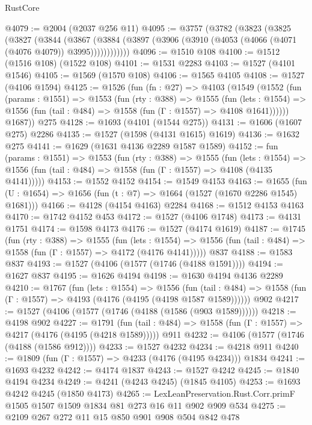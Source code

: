 \begin{lexlean}{RustCore}
\begin{coremodule}
@4079 := @2004 (@2037 @256 @11)
@4095 := @3757
    (@3782
      (@3823
        (@3825
          (@3827
            (@3844
              (@3867
                (@3884 (@3897 (@3906 (@3910 (@4053 (@4066 (@4071 (@4076 @4079)) @3995))))))))))))
@4096 := @1510 @108
@4100 := @1512 (@1516 @108) (@1522 @108)
@4101 := @1531 @2283
@4103 := @1527 (@4101 @1546)
@4105 := @1569 (@1570 @108)
@4106 := @1565 @4105
@4108 := @1527 (@4106 @1594)
@4125 := @1526
    (fun (fn : @27) =>
    @4103
      (@1549
        (@1552
          (fun (params : @1551) =>
          @1553
            (fun (rty : @388) =>
            @1555
              (fun (lets : @1554) =>
              @1556 (fun (tail : @484) => @1558 (fun (Γ : @1557) => @4108 @1641))))))
        @1687))
    @275
@4128 := @1693 (@4101 (@1544 @275))
@4131 := @1606 (@1607 @275) @2286
@4135 := @1527 (@1598 (@4131 @1615) @1619)
@4136 := @1632 @275
@4141 := @1629 (@1631 @4136 @2289 @1587 @1589)
@4152 := fun (params : @1551) =>
  @1553
    (fun (rty : @388) =>
    @1555
      (fun (lets : @1554) =>
      @1556 (fun (tail : @484) => @1558 (fun (Γ : @1557) => @4108 (@4135 @4141)))))
@4153 := @1552 @4152
@4154 := @1549 @4153
@4163 := @1655 (fun (U : @1654) => @1656 (fun (t : @7) => @1664 (@1527 (@1670 @2286 @1545) @1681)))
@4166 := @4128 (@4154 @4163) @2284
@4168 := @1512 @4153 @4163
@4170 := @1742 @4152 @453
@4172 := @1527 (@4106 @1748)
@4173 := @4131 @1751
@4174 := @1598 @4173
@4176 := @1527 (@4174 @1619)
@4187 := @1745
    (fun (rty : @388) =>
    @1555
      (fun (lets : @1554) =>
      @1556 (fun (tail : @484) => @1558 (fun (Γ : @1557) => @4172 (@4176 @4141)))))
    @837
@4188 := @1583 @837
@4193 := @1527 (@4106 (@1577 (@1746 (@4188 @1591))))
@4194 := @1627 @837
@4195 := @1626 @4194
@4198 := @1630 @4194 @4136 @2289
@4210 := @1767
    (fun (lets : @1554) =>
    @1556
      (fun (tail : @484) => @1558 (fun (Γ : @1557) => @4193 (@4176 (@4195 (@4198 @1587 @1589))))))
    @902
@4217 := @1527 (@4106 (@1577 (@1746 (@4188 (@1586 (@903 @1589))))))
@4218 := @4198 @902
@4227 := @1791
    (fun (tail : @484) => @1558 (fun (Γ : @1557) => @4217 (@4176 (@4195 (@4218 @1589)))))
    @911
@4232 := @4106 (@1577 (@1746 (@4188 (@1586 @912))))
@4233 := @1527 @4232
@4234 := @4218 @911
@4240 := @1809 (fun (Γ : @1557) => @4233 (@4176 (@4195 @4234))) @1834
@4241 := @1693 @4232
@4242 := @4174 @1837
@4243 := @1527 @4242
@4245 := @1840 @4194 @4234
@4249 := @4241 (@4243 @4245) (@1845 @4105)
@4253 := @1693 @4242 @4245 (@1850 @4173)
@4265 := LexLeanPreservation.Rust.Corr.primF @1505 @1507 @1509 @1834 @81 @273 @16 @11 @902 @909 @534
@4275 := @2109 @267 @272 @11 @15 @850 @901 @908 @504 @842 @478

\end{coremodule}
\end{lexlean}
